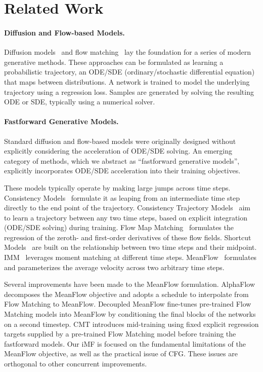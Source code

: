 \section{Related Work}

\paragraph{Diffusion and Flow-based Models.}
Diffusion models~\cite{diffusion,ddpm,edm,ncsn,scoresde} and flow matching~\cite{fm,rectified,stochastic} lay the foundation for a series of modern generative methods. 
These approaches can be formulated as learning a probabilistic trajectory, \ie an ODE/SDE (ordinary/stochastic differential equation) that maps between distributions.
A network is trained to model the underlying trajectory using a regression loss.
Samples are generated by solving the resulting ODE or SDE, typically using a numerical solver.

\paragraph{Fastforward Generative Models.}
%
Standard diffusion and flow-based models were originally designed without explicitly considering the acceleration of ODE/SDE solving.
An emerging category of methods, which we abstract as ``fastforward generative models'', explicitly incorporates ODE/SDE acceleration into their training objectives.

These models typically operate by making large jumps across time steps.
Consistency Models~\cite{cm,ict,ect,scm} formulate it as leaping from an intermediate time step directly to the end point of the trajectory.
Consistency Trajectory Models~\cite{ctm} aim to learn a trajectory between any two time steps, based on explicit integration (\ie ODE/SDE solving) during training.
Flow Map Matching~\cite{fmm} formulates the regression of the zeroth- and first-order derivatives of these flow fields.
Shortcut Models~\cite{shortcut} are built on the relationship between two time steps and their midpoint.
IMM~\cite{imm} leverages moment matching at different time steps.
MeanFlow~\cite{mf} formulates and parameterizes the average velocity across two arbitrary time steps.


Several improvements have been made to the MeanFlow formulation.
AlphaFlow \cite{alphaflow} decomposes the MeanFlow objective and adopts a schedule to interpolate from Flow Matching to MeanFlow.
Decoupled MeanFlow \cite{dmf} fine-tunes pre-trained Flow Matching models into MeanFlow by conditioning the final blocks of the networks on a second timestep.
CMT \cite{cmt} introduces mid-training using fixed explicit regression targets supplied by a pre-trained Flow Matching model before training the fastforward models. 
Our iMF is focused on the fundamental limitations of the MeanFlow objective, as well as the practical issue of CFG. These issues are orthogonal to other concurrent improvements.
